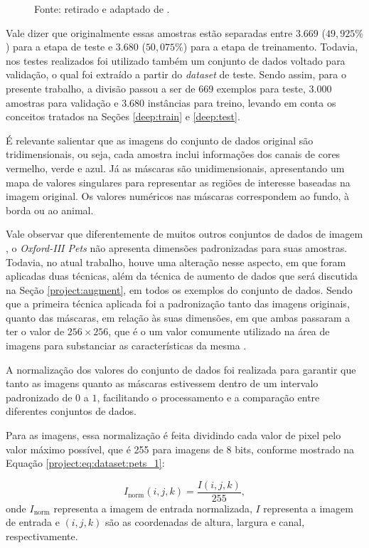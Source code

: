 \begin{figure}[H]
    Fonte: retirado e adaptado de \cite{Parkhi2012CatsDogs}.
\end{figure}

Vale dizer que originalmente essas amostras estão separadas entre $3.669$ ($49,925\%$) para a etapa de teste e $3.680$ ($50,075\%$) para a etapa de treinamento. Todavia, nos testes realizados foi utilizado também um conjunto de dados voltado para validação, o qual foi extraído a partir do \textit{dataset} de teste. Sendo assim, para o presente trabalho, a divisão passou a ser de $669$ exemplos para teste, 3.000 amostras para validação e 3.680 instâncias para treino, levando em conta os conceitos tratados na Seções \ref{deep:train} e \ref{deep:test}.

É relevante salientar que as imagens do conjunto de dados original são tridimensionais, ou seja, cada amostra inclui informações dos canais de cores vermelho, verde e azul. Já as máscaras são unidimensionais, apresentando um mapa de valores singulares para representar as regiões de interesse baseadas na imagem original. Os valores numéricos nas máscaras correspondem ao fundo, à borda ou ao animal.

Vale observar que diferentemente de muitos outros conjuntos de dados de imagem \citep{Bossard2014Food-101Forests}, o \textit{Oxford-III Pets} não apresenta dimensões padronizadas para suas amostras. Todavia, no atual trabalho, houve uma alteração nesse aspecto, em que foram aplicadas duas técnicas, além da técnica de aumento de dados que será discutida na Seção \ref{project:augment}, em todos os exemplos do conjunto de dados. Sendo que a primeira técnica aplicada foi a padronização tanto das imagens originais, quanto das máscaras, em relação às suas dimensões, em que ambas passaram a ter o valor de $256 \times 256$, que é o um valor comumente utilizado na área de imagens para substanciar as características da mesma \citep{Lee1983DigitalFilter}.

A normalização dos valores do conjunto de dados foi realizada para garantir que tanto as imagens quanto as máscaras estivessem dentro de um intervalo padronizado de $0$ a $1$, facilitando o processamento e a comparação entre diferentes conjuntos de dados.

Para as imagens, essa normalização é feita dividindo cada valor de pixel pelo valor máximo possível, que é 255 para imagens de 8 bits, conforme mostrado na Equação \ref{project:eq:dataset:pets_1}:

\begin{equation}
    \label{project:eq:dataset:pets_1}
    I_{\text{norm}}{(i,j,k)} = \frac{I{(i,j,k)}}{255},
\end{equation}
onde $I_{\text{norm}}$ representa a imagem de entrada normalizada, $I$ representa a imagem de entrada e $(i,j,k)$ são as coordenadas de altura, largura e canal, respectivamente.

